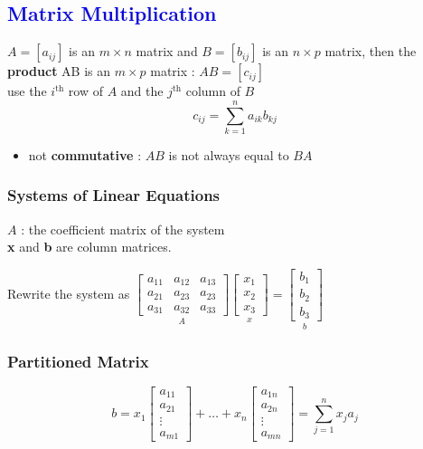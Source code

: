 \documentclass{article}
\newcommand\B{\textbf}
\newcommand\x{\times}
\begin{document}
    \subsection*{\textcolor{blue}{Matrix Multiplication}}

    \begin{tcolorbox}
        $A = [a_{ij}]$ is an $m \x n$ matrix and $B = [b_{ij}]$ is an $n \x p$ matrix, then the \textbf{product} AB
        is an $m \x p$ matrix : $AB = [c_{ij}]$ \\
        use the $i^{\text{th}}$ row of $A$ and the $j^{\text{th}}$ column of $B$  \[ c_{ij} = \sum_{k=1}^{n} a_{ik}b_{kj} \]
    \end{tcolorbox}

    \begin{itemize}
        \item not \B{commutative} : $AB$ is not always equal to $BA$
    \end{itemize}
    
    \subsubsection*{Systems of Linear Equations}

    $A$ : the coefficient matrix of the system\\
    \B{x} and \B{b} are column matrices.

    Rewrite the system as 
    $  \underset{A}{\begin{bmatrix}
        a_{11} & a_{12} & a_{13} \\
        a_{21} & a_{23} & a_{23} \\
        a_{31 } & a_{32} & a_{33}
    \end{bmatrix}
}
    \underset{x}{\begin{bmatrix}
        x_1 \\ x_2 \\ x_3
    \end{bmatrix}
}    = \underset{b}{\begin{bmatrix}
        b_1 \\ b_2 \\ b_3
    \end{bmatrix}}$

    \subsubsection*{Partitioned Matrix}
    \[b = x_1 \begin{bmatrix}
        a_{11} \\ a_{21} \\ \vdots \\ a_{m1}  \end{bmatrix} + \dots + x_n\begin{bmatrix}
            a_{1n} \\ a_{2n} \\ \vdots \\ a_{mn}
           \end{bmatrix} = \sum_{j=1}^{n} x_{j}a_{j} \]
\end{document}
